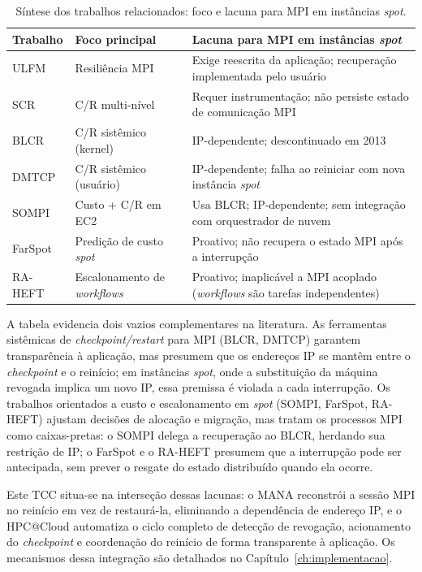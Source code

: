 \begin{table}[htb]
  \centering
  \caption{Síntese dos trabalhos relacionados: foco e lacuna para MPI em
           instâncias \textit{spot}.}
  \label{tab:rel-comparacao}
  {\small
  \begin{tabular}{l p{4.4cm} p{6.8cm}}
    \toprule
    \textbf{Trabalho} & \textbf{Foco principal} &
      \textbf{Lacuna para MPI em instâncias \textit{spot}} \\
    \midrule
    ULFM    & Resiliência MPI               & Exige reescrita da aplicação; recuperação implementada pelo usuário \\
    SCR     & C/R multi-nível               & Requer instrumentação; não persiste estado de comunicação MPI \\
    BLCR    & C/R sistêmico (kernel)        & IP-dependente; descontinuado em 2013 \\
    DMTCP   & C/R sistêmico (usuário)       & IP-dependente; falha ao reiniciar com nova instância \textit{spot} \\
    SOMPI   & Custo + C/R em EC2            & Usa BLCR; IP-dependente; sem integração com orquestrador de nuvem \\
    FarSpot & Predição de custo \textit{spot} & Proativo; não recupera o estado MPI após a interrupção \\
    RA-HEFT & Escalonamento de \textit{workflows} & Proativo; inaplicável a MPI acoplado (\textit{workflows} são tarefas independentes) \\
    \bottomrule
  \end{tabular}
  }
\end{table}

A tabela evidencia dois vazios complementares na literatura. As ferramentas
sistêmicas de \textit{checkpoint/restart} para MPI (BLCR, DMTCP) garantem
transparência à aplicação, mas presumem que os endereços IP se mantêm entre o
\textit{checkpoint} e o reinício; em instâncias \textit{spot}, onde a
substituição da máquina revogada implica um novo IP, essa premissa é violada a
cada interrupção. Os trabalhos orientados a custo e escalonamento em
\textit{spot} (SOMPI, FarSpot, RA-HEFT) ajustam decisões de alocação e
migração, mas tratam os processos MPI como caixas-pretas: o SOMPI delega a
recuperação ao BLCR, herdando sua restrição de IP; o FarSpot e o RA-HEFT
presumem que a interrupção pode ser antecipada, sem prever o resgate do estado
distribuído quando ela ocorre.

Este TCC situa-se na interseção dessas lacunas: o MANA reconstrói a sessão MPI
no reinício em vez de restaurá-la, eliminando a dependência de endereço IP, e
o HPC@Cloud automatiza o ciclo completo de detecção de revogação, acionamento
do \textit{checkpoint} e coordenação do reinício de forma transparente à
aplicação. Os mecanismos dessa integração são detalhados no
Capítulo~\ref{ch:implementacao}.


